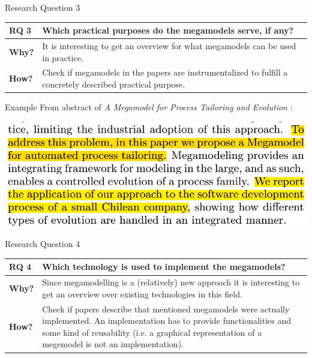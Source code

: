 \documentclass{beamer}
\begin{document}
\begin{frame}{Research Question 3}
\begin{tabular}{|l|p{9cm}|}\hline
\textbf{RQ 3} & Which practical purposes do the megamodels serve, if any?\\\hline
\textbf{Why?} & It is interesting to get an overview for what megamodels can be used in practice.\\\hline
\textbf{How?} & Check if megamodels in the papers are 	instrumentalized to fulfill a concretely described practical purpose.\\\hline
\end{tabular}
\end{frame}

\begin{frame}{Example}
From abstract of \textit{A Megamodel for Process Tailoring and Evolution} \cite{tailoring}:
\begin{center}
\includegraphics[width=1.0\textwidth]{ex_rq3}
\end{center}
\end{frame}

\begin{frame}{Research Question 4}
\begin{tabular}{|l|p{9cm}|}\hline
\textbf{RQ 4} & Which technology is used to implement the megamodels?\\\hline
\textbf{Why?} & Since megamodelling is a (relatively) new approach it is interesting to get an overview over existing technologies in this field.\\\hline
\textbf{How?} & Check if papers describe that mentioned megamodels were actually implemented. An implementation has to provide functionalities and some kind of reusability (i.e. a graphical representation of a megemodel is not an implementation).\\\hline
\end{tabular}
\end{frame}
\end{document}
